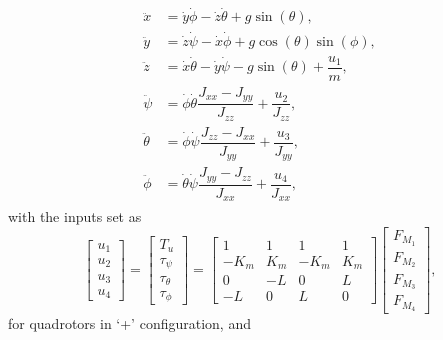 \begin{align}
\begin{split}
\ddot{x} & = \dot{y} \dot{\phi} - \dot{z} \dot{\theta} + g \sin(\theta), \\[5pt]
\ddot{y} & = \dot{z} \dot{\psi} - \dot{x} \dot{\phi} + g \cos(\theta)\sin(\phi), \\[5pt]
\ddot{z} & = \dot{x} \dot{\theta} - \dot{y} \dot{\psi} - g \sin(\theta) + \dfrac{u_{1}}{m}, \\[5pt]
\ddot{\psi} & = \dot{\phi}\dot{\theta} \dfrac{J_{xx}-J_{yy}}{J_{zz}} + \dfrac{u_{2}}{J_{zz}}, \\[5pt]
\ddot{\theta} & = \dot{\phi} \dot{\psi}\dfrac{J_{zz}-J_{xx}}{J_{yy}} + \dfrac{u_{3}}{J_{yy}}, \\[5pt]
\ddot{\phi} & =  \dot{\theta}\dot{\psi}\dfrac{J_{yy}-J_{zz}}{J_{xx}} + \dfrac{u_{4}}{J_{xx}},
\end{split}
\end{align}
with the inputs set as
\begin{equation}
\begin{bmatrix}
u_1 \\[5pt] u_2 \\[5pt] u_3 \\[5pt] u_4
\end{bmatrix} = \begin{bmatrix}
	T_u\\[5pt]
	\tau_{\psi}\\[5pt]
	\tau_{\theta}\\[5pt]
	\tau_{\phi}
	\end{bmatrix} = \begin{bmatrix}
	1 & 1 & 1 & 1 \\[5pt]
	-K_{m} & K_{m} & -K_{m} & K_{m}\\[5pt]
	0 & -L & 0 & L\\[5pt]
	-L & 0 & L & 0
							\end{bmatrix}
\begin{bmatrix}
F_{M_1}\\[5pt]
F_{M_2}\\[5pt]
F_{M_3}\\[5pt]
F_{M_4}
\end{bmatrix},				
\end{equation}
for quadrotors in `+' configuration, and
